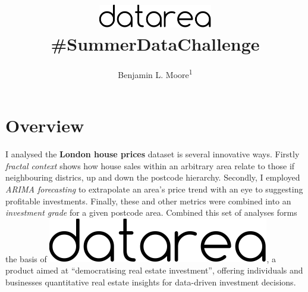 \documentclass[
10pt, %
a4paper, %
oneside, %
headinclude,footinclude, %
BCOR5mm, %
]{scrartcl}
\title{ \vspace{-3em}
\includegraphics[width=5cm]{Figures/datarea.pdf} \\
{\large \#SummerDataChallenge}} %
\author{ {\large Benjamin L. Moore\textsuperscript{1}}} %
\date{} %
\newcommand*{\logo}{\includegraphics[scale=.22]{Figures/datarea.pdf}}
\begin{document}

\renewcommand{\sectionmark}[1]{\markright{\spacedlowsmallcaps{summerdatachallenge}}} %
\lehead{\mbox{\llap{\small\thepage\kern1em\color{halfgray} \vline}\color{halfgray}\hspace{0.5em}\rightmark\hfil}} %

\pagestyle{scrheadings} %


\maketitle %

\setcounter{tocdepth}{2} %




\vspace{-4em}
\section*{Overview} 

I analysed the {\bf London house prices} dataset is several innovative
ways. Firstly \emph{fractal context} shows how house sales within an
arbitrary area relate to those if neighbouring districs, up and down
the postcode hierarchy. Secondly, I employed \emph{ARIMA forecasting}
to extrapolate an area's price trend with an eye to suggesting
profitable investments. Finally, these and other metrics were combined
into an \emph{investment grade} for a given postcode area. Combined
this set of analyses forms the basis of \logo, a product aimed at
``democratising real estate investment'', offering individuals and
businesses quantitative real estate insights for data-driven investment
decisions. 
\end{document}
